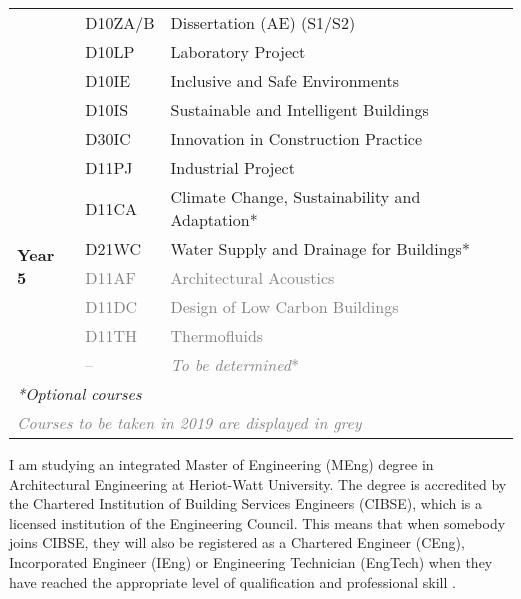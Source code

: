 \begin{table}[htbp]
\begin{tabular}{@{}lll@{}}
		& D10ZA/B & Dissertation (AE) (S1/S2) \\
		& D10LP & Laboratory Project \\
		& D10IE & Inclusive and Safe Environments \\
		& D10IS & Sustainable and Intelligent Buildings \\
		& D30IC & Innovation in Construction Practice \\ \midrule
		\multirow{7}{*}{\textbf{Year 5}} & D11PJ & Industrial Project \\
		& D11CA & Climate Change, Sustainability and Adaptation* \\
		& D21WC & Water Supply and Drainage for Buildings* \\
		& \textcolor{gray}{D11AF} & \textcolor{gray}{Architectural Acoustics} \\
		& \textcolor{gray}{D11DC} & \textcolor{gray}{Design of Low Carbon Buildings} \\
		& \textcolor{gray}{D11TH} & \textcolor{gray}{Thermofluids} \\
		& \textcolor{gray}{--} & \textcolor{gray}{\textit{To be determined}*} \\ \bottomrule
		\multicolumn{3}{l}{\textit{*Optional courses}} \\
		\multicolumn{3}{l}{\textcolor{gray}{\textit{Courses to be taken in 2019 are displayed in grey}}} \\
	\end{tabular}
\end{table}


I am studying an integrated Master of Engineering (MEng) degree in Architectural Engineering at Heriot-Watt University.
The degree is accredited by the Chartered Institution of Building Services Engineers (CIBSE), which is a licensed institution of the Engineering Council.
This means that when somebody joins CIBSE, they will also be registered as a Chartered Engineer (CEng), Incorporated Engineer (IEng) or Engineering Technician (EngTech) when they have reached the appropriate level of qualification and professional skill \citep{whyjoinCIBSE}.

